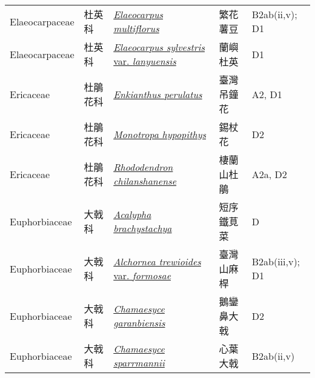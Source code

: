 {\begin{longtable}{p{2.5cm}p{2.5cm}p{4.5cm}p{2.5cm}p{3cm}}
    Elaeocarpaceae & 杜英科 & \href{http://www.theplantlist.org/tpl1.1/search?q=Elaeocarpus+multiflorus}{\textit{Elaeocarpus multiflorus} } & 繁花薯豆 & B2ab(ii,v); D1 \index{Elaeocarpus@\textit{Elaeocarpus}!multiflorus@\textit{multiflorus}}  \index{繁花薯豆} \\
    Elaeocarpaceae & 杜英科 & \href{http://www.theplantlist.org/tpl1.1/search?q=Elaeocarpus+sylvestris+var.+lanyuensis}{\textit{Elaeocarpus sylvestris} var. \textit{lanyuensis} } & 蘭嶼杜英 & D1 \index{Elaeocarpus@\textit{Elaeocarpus}!sylvestris@\textit{sylvestris}!var. lanyuensis@var. \textit{lanyuensis}}  \index{蘭嶼杜英} \\
    Ericaceae & 杜鵑花科 & \href{http://www.theplantlist.org/tpl1.1/search?q=Enkianthus+perulatus}{\textit{Enkianthus perulatus} } & 臺灣吊鐘花 & A2, D1 \index{Enkianthus@\textit{Enkianthus}!perulatus@\textit{perulatus}}  \index{臺灣吊鐘花} \\
    Ericaceae & 杜鵑花科 & \href{http://www.theplantlist.org/tpl1.1/search?q=Monotropa+hypopithys}{\textit{Monotropa hypopithys} } & 錫杖花 & D2 \index{Monotropa@\textit{Monotropa}!hypopithys@\textit{hypopithys}}  \index{錫杖花} \\
    Ericaceae & 杜鵑花科 & \href{http://www.theplantlist.org/tpl1.1/search?q=Rhododendron+chilanshanense}{\textit{Rhododendron chilanshanense} } & 棲蘭山杜鵑 & A2a, D2 \index{Rhododendron@\textit{Rhododendron}!chilanshanense@\textit{chilanshanense}}  \index{棲蘭山杜鵑} \\
    Euphorbiaceae & 大戟科 & \href{http://www.theplantlist.org/tpl1.1/search?q=Acalypha+brachystachya}{\textit{Acalypha brachystachya} } & 短序鐵莧菜 & D \index{Acalypha@\textit{Acalypha}!brachystachya@\textit{brachystachya}}  \index{短序鐵莧菜} \\
    Euphorbiaceae & 大戟科 & \href{http://www.theplantlist.org/tpl1.1/search?q=Alchornea+trewioides+var.+formosae}{\textit{Alchornea trewioides} var. \textit{formosae} } & 臺灣山麻桿 & B2ab(iii,v); D1 \index{Alchornea@\textit{Alchornea}!trewioides@\textit{trewioides}!var. formosae@var. \textit{formosae}}  \index{臺灣山麻桿} \\
    Euphorbiaceae & 大戟科 & \href{http://www.theplantlist.org/tpl1.1/search?q=Chamaesyce+garanbiensis}{\textit{Chamaesyce garanbiensis} } & 鵝鑾鼻大戟 & D2 \index{Chamaesyce@\textit{Chamaesyce}!garanbiensis@\textit{garanbiensis}}  \index{鵝鑾鼻大戟} \\
    Euphorbiaceae & 大戟科 & \href{http://www.theplantlist.org/tpl1.1/search?q=Chamaesyce+sparrmannii}{\textit{Chamaesyce sparrmannii} } & 心葉大戟 & B2ab(ii,v) \index{Chamaesyce@\textit{Chamaesyce}!sparrmannii@\textit{sparrmannii}}  \index{心葉大戟} \\

\end{longtable}}
